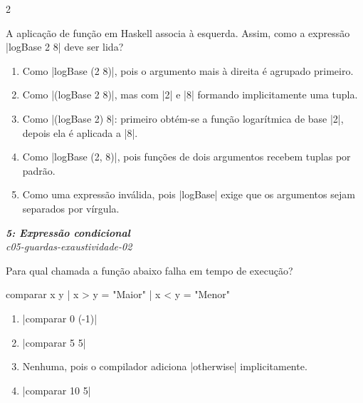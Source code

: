\documentclass[a4paper,10pt,brazil]{article}
\begin{document}
\begin{multicols}{2}
\begin{flushright}
\end{flushright}
A aplicação de função em Haskell associa à esquerda. Assim, como a expressão \haskellinline|logBase 2 8| deve ser lida?

\begin{enumerate}
  \item Como \haskellinline|logBase (2 8)|, pois o argumento mais à direita é agrupado primeiro.

  \item Como \haskellinline|(logBase 2 8)|, mas com \haskellinline|2| e \haskellinline|8| formando implicitamente uma tupla.

  \item Como \haskellinline|(logBase 2) 8|: primeiro obtém-se a função logarítmica de base \haskellinline|2|, depois ela é aplicada a \haskellinline|8|.

  \item Como \haskellinline|logBase (2, 8)|, pois funções de dois argumentos recebem tuplas por padrão.

  \item Como uma expressão inválida, pois \haskellinline|logBase| exige que os argumentos sejam separados por vírgula.


\end{enumerate}

\begin{flushright}
  \footnotesize
  \textit{\textbf{5: Expressão condicional}}\\
  \textit{c05-guardas-exaustividade-02}\\

\end{flushright}
Para qual chamada a função abaixo falha em tempo de execução?
\begin{haskellcode}
comparar x y
  | x > y = "Maior"
  | x < y = "Menor"
\end{haskellcode}

\begin{enumerate}
  \item \haskellinline|comparar 0 (-1)|

  \item \haskellinline|comparar 5 5|

  \item Nenhuma, pois o compilador adiciona \haskellinline|otherwise| implicitamente.

  \item \haskellinline|comparar 10 5|


\end{enumerate}
\end{multicols}
\end{document}

